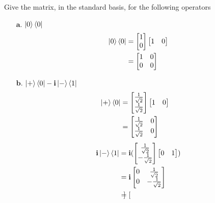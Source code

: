 \documentclass[11pt]{article}
\def\bfi{\ensuremath\textbf{i}}
\def\srtt{\ensuremath\frac{1}{\sqrt{2}}}
\begin{document}
Give the matrix, in the standard basis, for the following operators

\begin{enumerate}
    \item[$\textbf{a.}$] $\ket{0}\bra{0}$  \\
        \begin{align*}
            \ket{0}\bra{0} &= \begin{bmatrix}1 \\ 0 \end{bmatrix} \begin{bmatrix}1 & 0 \end{bmatrix} \\
                &= \begin{bmatrix}1 & 0 \\ 0 & 0 \end{bmatrix} 
        \end{align*}
    \item[$\textbf{b.}$] $\ket{+}\bra{0} - \bfi\ket{-}\bra{1}$
        \begin{align*}
            \ket{+}\bra{0}  
                &= 
                 \begin{bmatrix}\srtt \\ \srtt \end{bmatrix}
                 \begin{bmatrix}1 & 0\end{bmatrix}  \\
                     &= \begin{bmatrix} \srtt & 0 \\ \srtt & 0 \end{bmatrix}
                         & 
        \end{align*}
        \begin{align*}
            \bfi\ket{-}\bra{1} 
                &= \bfi(\begin{bmatrix}\srtt \\ -\srtt \end{bmatrix}
                    \begin{bmatrix} 0  & 1 \end{bmatrix})  \\
                &= \bfi\begin{bmatrix}
                    0 & \srtt \\
                    0 & -\srtt 
                \end{bmatrix} \\
                &= \begin{bmatrix}

\end{bmatrix}
\end{align*}
\end{enumerate}
\end{document}
